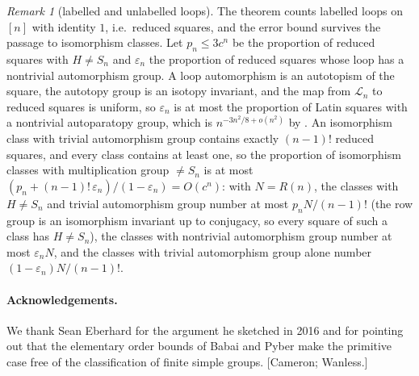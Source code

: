 \documentclass[11pt]{amsart}
\theoremstyle{plain}
\theoremstyle{remark}
\newtheorem{remark}[theorem]{Remark}
\newcommand{\LL}{\mathcal{L}}
\begin{document}
\begin{remark}[labelled and unlabelled loops]
The theorem counts labelled loops on $[n]$ with identity $1$, i.e.\
reduced squares, and the error bound survives the passage to
isomorphism classes.  Let $p_n\le3c^n$ be the proportion of reduced
squares with $H\ne S_n$ and $\varepsilon_n$ the proportion of reduced
squares whose loop has a nontrivial automorphism group.  A loop
automorphism is an autotopism of the square, the autotopy group is an
isotopy invariant, and the map from $\LL_n$ to reduced squares is
uniform, so $\varepsilon_n$ is at most the proportion of Latin squares
with a nontrivial autoparatopy group, which is $n^{-3n^2/8+o(n^2)}$ by
\cite[Theorem~4]{MW05}.  An isomorphism class with trivial automorphism
group contains exactly $(n-1)!$ reduced squares, and every class
contains at least one, so the proportion of isomorphism classes with
multiplication group $\ne S_n$ is at most
$(p_n+(n-1)!\,\varepsilon_n)/(1-\varepsilon_n)=O(c^n)$: with $N=R(n)$,
the classes with $H\ne S_n$ and trivial automorphism group number at
most $p_nN/(n-1)!$ (the row group is an isomorphism invariant up to
conjugacy, so every square of such a class has $H\ne S_n$), the classes
with nontrivial automorphism group number at most $\varepsilon_nN$, and
the classes with trivial automorphism group alone number
$(1-\varepsilon_n)N/(n-1)!$.
\end{remark}

\paragraph{Acknowledgements.}  We thank Sean Eberhard for the argument
he sketched in 2016 and for pointing out that the elementary order
bounds of Babai and Pyber make the primitive case free of the
classification of finite simple groups.  [Cameron; Wanless.]
\end{document}
